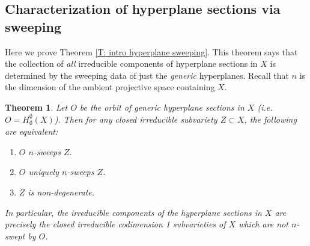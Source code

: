 \documentclass{amsart}
\newtheorem{theorem}{Theorem}[section]
\theoremstyle{definition}
\begin{document}
\subsection{Characterization of hyperplane sections via sweeping}

Here we prove Theorem \ref{T: intro hyperplane sweeping}. This theorem says that the collection of \textit{all} irreducible components of hyperplane sections in $X$ is determined by the sweeping data of just the \textit{generic} hyperplanes. Recall that $n$ is the dimension of the ambient projective space containing $X$.

\begin{theorem}\label{L: hyperplane sweeping} Let $O$ be the orbit of generic hyperplane sections in $X$ (i.e. $O=H_\emptyset^{\emptyset}(X)$). Then for any closed irreducible subvariety $Z\subset X$, the following are equivalent:
\begin{enumerate}
    \item $O$ $n$-sweeps $Z$.
    \item $O$ uniquely $n$-sweeps $Z$.
    \item $Z$ is non-degenerate.
\end{enumerate}

In particular, the irreducible components of the hyperplane sections in $X$ are precisely the closed irreducible codimension 1 subvarieties of $X$ which are not $n$-swept by $O$.
\end{theorem}
\end{document}
